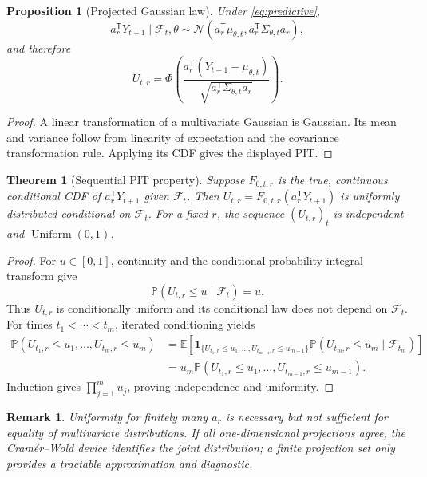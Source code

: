 \documentclass[11pt]{article}
\newtheorem{proposition}[definition]{Proposition}
\newtheorem{theorem}[definition]{Theorem}
\newtheorem{remark}[definition]{Remark}
\newcommand{\E}{\mathbb{E}}
\newcommand{\Pp}{\mathbb{P}}
\newcommand{\F}{\mathcal{F}}
\newcommand{\N}{\mathcal{N}}
\newcommand{\ind}{\mathbf{1}}
\begin{document}
\begin{proposition}[Projected Gaussian law]
Under \eqref{eq:predictive},
\[
a_r^{\mathsf T}Y_{t+1}\mid\F_t,\theta
\sim \N\!\left(a_r^{\mathsf T}\mu_{\theta,t},
a_r^{\mathsf T}\Sigma_{\theta,t}a_r\right),
\]
and therefore
\[
U_{t,r}=\Phi\!\left(
\frac{a_r^{\mathsf T}(Y_{t+1}-\mu_{\theta,t})}
{\sqrt{a_r^{\mathsf T}\Sigma_{\theta,t}a_r}}
\right).
\]
\end{proposition}

\begin{proof}
A linear transformation of a multivariate Gaussian is Gaussian. Its mean and
variance follow from linearity of expectation and the covariance transformation
rule. Applying its CDF gives the displayed PIT.
\end{proof}

\begin{theorem}[Sequential PIT property]
Suppose $F_{0,t,r}$ is the true, continuous conditional CDF of
$a_r^{\mathsf T}Y_{t+1}$ given $\F_t$. Then
$U_{t,r}=F_{0,t,r}(a_r^{\mathsf T}Y_{t+1})$ is uniformly distributed conditional
on $\F_t$. For a fixed $r$, the sequence $(U_{t,r})_t$ is independent and
$\operatorname{Uniform}(0,1)$.
\end{theorem}

\begin{proof}
For $u\in[0,1]$, continuity and the conditional probability integral transform
give
\[
\Pp(U_{t,r}\leq u\mid\F_t)=u.
\]
Thus $U_{t,r}$ is conditionally uniform and its conditional law does not depend on
$\F_t$. For times $t_1<\cdots<t_m$, iterated conditioning yields
\begin{align*}
\Pp(U_{t_1,r}\leq u_1,\ldots,U_{t_m,r}\leq u_m)
&=\E\left[
\ind_{\{U_{t_1,r}\leq u_1,\ldots,U_{t_{m-1},r}\leq u_{m-1}\}}
\Pp(U_{t_m,r}\leq u_m\mid\F_{t_m})
\right]\\
&=u_m\Pp(U_{t_1,r}\leq u_1,\ldots,U_{t_{m-1},r}\leq u_{m-1}).
\end{align*}
Induction gives $\prod_{j=1}^m u_j$, proving independence and uniformity.
\end{proof}

\begin{remark}
Uniformity for finitely many $a_r$ is necessary but not sufficient for equality of
multivariate distributions. If all one-dimensional projections agree, the
Cram\'er--Wold device identifies the joint distribution; a finite projection set
only provides a tractable approximation and diagnostic.
\end{remark}
\end{document}
